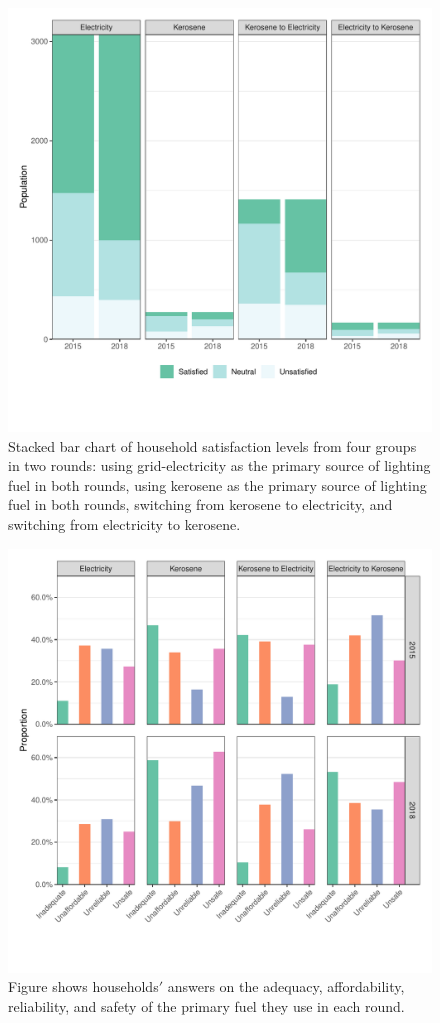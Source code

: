 \documentclass[11pt,english]{article}
\theoremstyle{plain} \newtheorem{claim}{Claim}
\theoremstyle{plain} \newtheorem{prop}{Proposition}
\theoremstyle{plain} \newtheorem{hypo}{Hypothesis}
\begin{document}
\begin{figure}[h!]
\centering
\includegraphics[scale=1]{Figures/Satisfaction1.pdf}
\caption{Stacked bar chart of household satisfaction levels from four groups in two rounds: using grid-electricity as the primary source of lighting fuel in both rounds, using kerosene as the primary source of lighting fuel in both rounds, switching from kerosene to electricity, and switching from electricity to kerosene. }
\label{satisfaction1}
\end{figure}

\begin{figure}[h!]
\centering
\includegraphics[scale=1]{Figures/Satisfaction2.pdf}
\caption{Figure shows households$'$ answers on the adequacy, affordability, reliability, and safety of the primary fuel they use in each round.}
\label{satisfaction2}
\end{figure}
\end{document}
